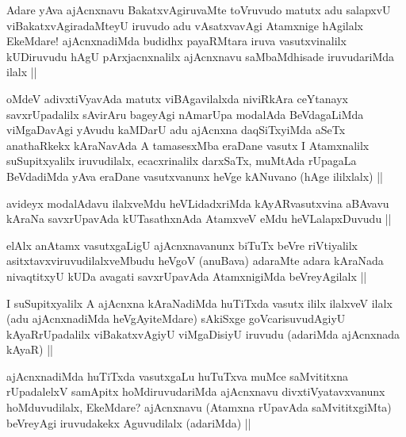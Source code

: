 
\begin{artha}
Adare yAva ajAcnxnavu BakatxvAgiruvaMte toVruvudo matutx adu salapxvU viBakatxvAgiradaMteyU iruvudo adu vAsatxvavAgi Atamxnige hAgilalx EkeMdare! ajAcnxnadiMda budidhx payaRMtara iruva vasutxvinalilx kUDiruvudu hAgU pArxjacnxnalilx ajAcnxnavu saMbaMdhisade iruvudariMda ilalx ||
\end{artha}


\begin{artha}
oMdeV adivxtiVyavAda matutx viBAgavilalxda niviRkAra ceYtanayx savxrUpadalilx sAvirAru bageyAgi nAmarUpa modalAda BeVdagaLiMda viMgaDavAgi yAvudu kaMDarU adu ajAcnxna daqSiTxyiMda aSeTx anathaRkekx kAraNavAda A tamasesxMba eraDane vasutx I Atamxnalilx suSupitxyalilx iruvudilalx, ecacxrinalilx darxSaTx, muMtAda rUpagaLa BeVdadiMda yAva eraDane vasutxvanunx heVge kANuvano (hAge ililxlalx) ||
\end{artha}


\begin{artha}
avideyx modalAdavu ilalxveMdu heVLidadxriMda kAyARvasutxvina aBAvavu kAraNa savxrUpavAda kUTasathxnAda AtamxveV eMdu heVLalapxDuvudu ||
\end{artha}


\begin{artha}
elAlx anAtamx vasutxgaLigU ajAcnxnavanunx biTuTx beVre riVtiyalilx asitxtavxviruvudilalxveMbudu heVgoV (anuBava) adaraMte adara kAraNada nivaqtitxyU kUDa avagati savxrUpavAda AtamxnigiMda beVreyAgilalx ||
\end{artha}

\begin{artha}
I suSupitxyalilx A ajAcnxna kAraNadiMda huTiTxda vasutx ililx ilalxveV ilalx (adu ajAcnxnadiMda heVgAyiteMdare) sAkiSxge goVcarisuvudAgiyU kAyaRrUpadalilx viBakatxvAgiyU viMgaDisiyU iruvudu (adariMda ajAcnxnada kAyaR) ||
\end{artha}

\begin{artha}
ajAcnxnadiMda huTiTxda vasutxgaLu huTuTxva muMce saMvititxna rUpadalelxV samApitx hoMdiruvudariMda ajAcnxnavu divxtiVyatavxvanunx hoMduvudilalx, EkeMdare? ajAcnxnavu (Atamxna rUpavAda saMvititxgiMta) beVreyAgi iruvudakekx Aguvudilalx (adariMda) ||
\end{artha}

